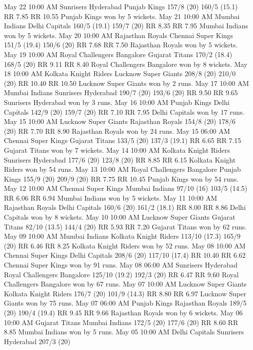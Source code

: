 May 22
10:00 AM
Sunrisers Hyderabad
Punjab Kings
157/8 (20)
160/5 (15.1)
RR 7.85
RR 10.55
Punjab Kings won by 5 wickets.
May 21
10:00 AM
Mumbai Indians
Delhi Capitals
160/5 (19.1)
159/7 (20)
RR 8.35
RR 7.95
Mumbai Indians won by 5 wickets.
May 20
10:00 AM
Rajasthan Royals
Chennai Super Kings
151/5 (19.4)
150/6 (20)
RR 7.68
RR 7.50
Rajasthan Royals won by 5 wickets.
May 19
10:00 AM
Royal Challengers Bangalore
Gujarat Titans
170/2 (18.4)
168/5 (20)
RR 9.11
RR 8.40
Royal Challengers Bangalore won by 8 wickets.
May 18
10:00 AM
Kolkata Knight Riders
Lucknow Super Giants
208/8 (20)
210/0 (20)
RR 10.40
RR 10.50
Lucknow Super Giants won by 2 runs.
May 17
10:00 AM
Mumbai Indians
Sunrisers Hyderabad
190/7 (20)
193/6 (20)
RR 9.50
RR 9.65
Sunrisers Hyderabad won by 3 runs.
May 16
10:00 AM
Punjab Kings
Delhi Capitals
142/9 (20)
159/7 (20)
RR 7.10
RR 7.95
Delhi Capitals won by 17 runs.
May 15
10:00 AM
Lucknow Super Giants
Rajasthan Royals
154/8 (20)
178/6 (20)
RR 7.70
RR 8.90
Rajasthan Royals won by 24 runs.
May 15
06:00 AM
Chennai Super Kings
Gujarat Titans
133/5 (20)
137/3 (19.1)
RR 6.65
RR 7.15
Gujarat Titans won by 7 wickets.
May 14
10:00 AM
Kolkata Knight Riders
Sunrisers Hyderabad
177/6 (20)
123/8 (20)
RR 8.85
RR 6.15
Kolkata Knight Riders won by 54 runs.
May 13
10:00 AM
Royal Challengers Bangalore
Punjab Kings
155/9 (20)
209/9 (20)
RR 7.75
RR 10.45
Punjab Kings won by 54 runs.
May 12
10:00 AM
Chennai Super Kings
Mumbai Indians
97/10 (16)
103/5 (14.5)
RR 6.06
RR 6.94
Mumbai Indians won by 5 wickets.
May 11
10:00 AM
Rajasthan Royals
Delhi Capitals
160/6 (20)
161/2 (18.1)
RR 8.00
RR 8.86
Delhi Capitals won by 8 wickets.
May 10
10:00 AM
Lucknow Super Giants
Gujarat Titans
82/10 (13.5)
144/4 (20)
RR 5.93
RR 7.20
Gujarat Titans won by 62 runs.
May 09
10:00 AM
Mumbai Indians
Kolkata Knight Riders
113/10 (17.3)
165/9 (20)
RR 6.46
RR 8.25
Kolkata Knight Riders won by 52 runs.
May 08
10:00 AM
Chennai Super Kings
Delhi Capitals
208/6 (20)
117/10 (17.4)
RR 10.40
RR 6.62
Chennai Super Kings won by 91 runs.
May 08
06:00 AM
Sunrisers Hyderabad
Royal Challengers Bangalore
125/10 (19.2)
192/3 (20)
RR 6.47
RR 9.60
Royal Challengers Bangalore won by 67 runs.
May 07
10:00 AM
Lucknow Super Giants
Kolkata Knight Riders
176/7 (20)
101/9 (14.3)
RR 8.80
RR 6.97
Lucknow Super Giants won by 75 runs.
May 07
06:00 AM
Punjab Kings
Rajasthan Royals
189/5 (20)
190/4 (19.4)
RR 9.45
RR 9.66
Rajasthan Royals won by 6 wickets.
May 06
10:00 AM
Gujarat Titans
Mumbai Indians
172/5 (20)
177/6 (20)
RR 8.60
RR 8.85
Mumbai Indians won by 5 runs.
May 05
10:00 AM
Delhi Capitals
Sunrisers Hyderabad
207/3 (20)
